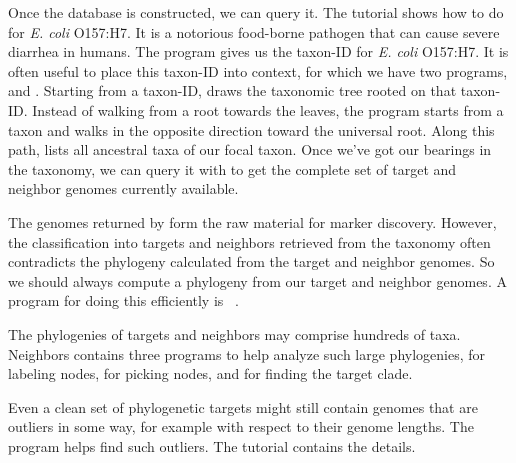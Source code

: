 Once the database is constructed, we can query it. The tutorial shows
how to do for \emph{E. coli} O157:H7. It is a notorious food-borne
pathogen that can cause severe diarrhea in humans. The
program  gives us the taxon-ID for \emph{E. coli} O157:H7. It
is often useful to place this taxon-ID into context, for which we have
two programs,  and . Starting from a
taxon-ID,  draws the taxonomic tree rooted on that
taxon-ID. Instead of walking from a root towards the leaves, the
program  starts from a taxon and walks in the opposite
direction toward the universal root. Along this path,  lists
all ancestral taxa of our focal taxon. Once we've got our bearings in
the taxonomy, we can query it with  to get the complete
set of target and neighbor genomes currently available.

The genomes returned by  form the raw material for
marker discovery. However, the classification into targets and
neighbors retrieved from the taxonomy often contradicts the phylogeny
calculated from the target and neighbor genomes. So we should always
compute a phylogeny from our target and neighbor genomes. A program
for doing this efficiently is ~\cite{klo20:phy}.

The phylogenies of targets and neighbors may comprise hundreds of
taxa. Neighbors contains three programs to help analyze such large
phylogenies,  for labeling nodes,  for picking
nodes, and  for finding the target clade.

Even a clean set of phylogenetic targets might still contain genomes
that are outliers in some way, for example with respect to their
genome lengths. The program  helps find such
outliers. The tutorial contains the details.
